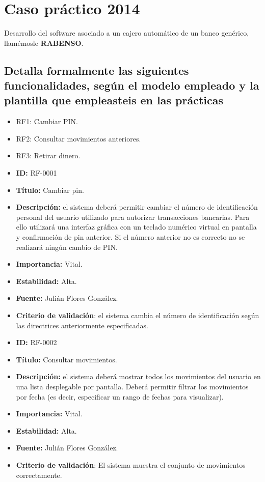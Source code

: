 \section{Caso práctico 2014}

Desarrollo del software asociado a un cajero automático de un banco genérico, llamémosle \textbf{RABENSO}.

\subsection{Detalla formalmente las siguientes funcionalidades, según el modelo empleado y la plantilla que empleasteis en las prácticas}
\begin{itemize}
    \item RF1: Cambiar PIN.
    \item RF2: Consultar movimientos anteriores.
    \item RF3: Retirar dinero.
\end{itemize}

\begin{itemize}
\item \textbf{ID:} RF-0001
\item \textbf{Título:} Cambiar pin.
\item \textbf{Descripción:} el sistema deberá permitir cambiar el número de identificación personal del usuario utilizado para autorizar transacciones bancarias. Para ello utilizará una interfaz gráfica con un teclado numérico virtual en pantalla y confirmación de pin anterior. Si el número anterior no es correcto no se realizará ningún cambio de PIN.
\item \textbf{Importancia:} Vital.
\item \textbf{Estabilidad:} Alta.
\item \textbf{Fuente:} Julián Flores González.
\item \textbf{Criterio de validación}: el sistema cambia el número de identificación según las directrices anteriormente especificadas.
\end{itemize}

\begin{itemize}
\item \textbf{ID:} RF-0002
\item \textbf{Título:} Consultar movimientos.
\item \textbf{Descripción:} el sistema deberá mostrar todos los movimientos del usuario en una lista desplegable por pantalla. Deberá permitir filtrar los movimientos por fecha (es decir, especificar un rango de fechas para visualizar).
\item \textbf{Importancia:} Vital.
\item \textbf{Estabilidad:} Alta.
\item \textbf{Fuente:} Julián Flores González.
\item \textbf{Criterio de validación}: El sistema muestra el conjunto de movimientos correctamente.
\end{itemize}

